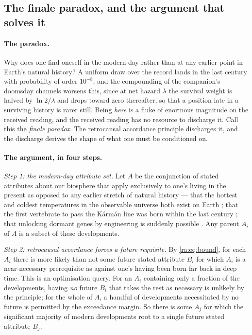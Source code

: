 \documentclass[11pt]{article}
\numberwithin{equation}{section}
\theoremstyle{plain}
\theoremstyle{definition}
\theoremstyle{remark}
\begin{document}
\subsection{The finale paradox, and the argument that solves it}
\label{ra:sub:finale}

\paragraph{The paradox.} Why does one find oneself in the modern day
rather than at any earlier point in Earth's natural history? A uniform
draw over the record lands in the last century with probability of order
$10^{-8}$; and the compounding of the companion's doomsday channels
worsens this, since at net hazard $\lambda$ the survival weight is
halved by $\ln2/\lambda$ and drops toward zero thereafter, so that a
position late in a surviving history is rarer still. Being \emph{here}
is a fluke of enormous magnitude on the received reading, and the
received reading has no resource to discharge it. Call this the
\emph{finale paradox}. The retrocausal accordance principle discharges
it, and the discharge derives the shape of what one must be conditioned
on.

\paragraph{The argument, in four steps.}

\emph{Step 1: the modern-day attribute set.} Let $A$ be the conjunction
of stated attributes about our biosphere that apply exclusively to
one's living in the present as opposed to any earlier stretch of natural
history --- that the hottest and coldest temperatures in the observable
universe both exist on Earth
\cite{ALICE2012Temperature,Kovachy2015Picokelvin}; that the first
vertebrate to pass the K\'arm\'an line was born within the last century
\cite{burgess2007animals}; that unlocking dormant genes by engineering is
suddenly possible \cite{Pattali2026_CRISPR_epigenome_mod}. Any parent
$A_i$ of $A$ is a subset of these developments.

\emph{Step 2: retrocausal accordance forces a future requisite.} By
\eqref{ra:eq:bound}, for each $A_i$ there is more likely than not some
future stated attribute $B_i$ for which $A_i$ is a near-necessary
prerequisite as against one's having been born far back in deep time.
This is an optimisation query. For an $A_i$ containing only a fraction
of the developments, having \emph{no} future $B_i$ that takes the rest
as necessary is unlikely by the principle; for the whole of $A$, a
handful of developments necessitated by no future is permitted by the
exceedance margin. So there is some $A_j$ for which the significant
majority of modern developments root to a single future stated attribute
$B_j$.
\end{document}
